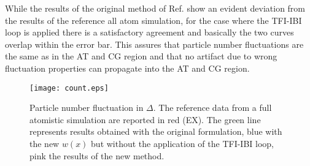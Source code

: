 \documentclass[aps,pre,preprint]{revtex4}
\begin{document}
While the results of the original method of Ref.\cite{prlgc} show an evident deviation from the results of the reference all atom simulation, for the case where the TFI-IBI loop is applied there is a satisfactory agreement and basically the two curves overlap within the error bar. This assures that particle number fluctuations are the same as in the AT and CG region and that no artifact due to wrong fluctuation properties can propagate into the AT and CG region.
\begin{figure}
  \centering
  \texttt{[image: count.eps]}
  \caption{Particle number fluctuation in $\Delta$. The reference data from a full atomistic simulation are reported in red (EX). The green line represents results obtained with the original formulation, blue with the new $w(x)$ but without the application of the TFI-IBI loop, pink the results of the new method.}
  \label{fluct}
\end{figure}
\end{document}
